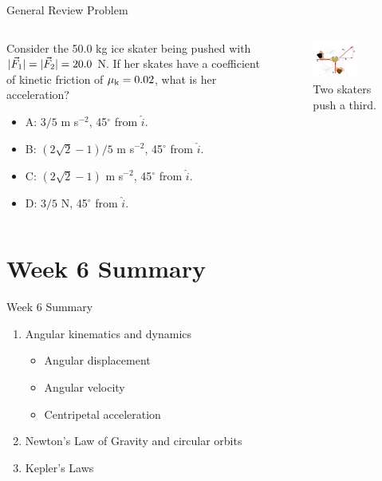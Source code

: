 \documentclass{beamer}
\begin{document}
\begin{frame}{General Review Problem}
\begin{columns}[T]
\begin{column}{0.5\textwidth}
\small
Consider the 50.0 kg ice skater being pushed with $|\vec{F}_{\rm 1}|=|\vec{F}_{\rm 2}|=20.0$ N.  If her skates have a coefficient of kinetic friction of $\mu_{\rm k} = 0.02$, what is her acceleration?
\begin{itemize}
\item A: $3/5$ m s$^{-2}$, 45$^{\circ}$ from $\hat{i}$.
\item B: $(2\sqrt{2}-1)/5$ m s$^{-2}$, 45$^{\circ}$ from $\hat{i}$.
\item C: $(2\sqrt{2}-1)$ m s$^{-2}$, 45$^{\circ}$ from $\hat{i}$.
\item D: $3/5$ N, 45$^{\circ}$ from $\hat{i}$.
\end{itemize}
\end{column}
\begin{column}{0.5\textwidth}
\begin{figure}
\centering
\includegraphics[width=0.7\textwidth]{figures/skate.png}
\caption{\label{fig:skate} Two skaters push a third.}
\end{figure}
\end{column}
\end{columns}
\end{frame}

\section{Week 6 Summary}

\begin{frame}{Week 6 Summary}
\begin{enumerate}
\item \alert{Angular} kinematics and dynamics
\begin{itemize}
\item Angular displacement
\item Angular velocity
\item Centripetal acceleration
\end{itemize}
\item \alert{Newton's Law of Gravity} and circular orbits
\item Kepler's Laws
\end{enumerate}
\end{frame}
\end{document}
